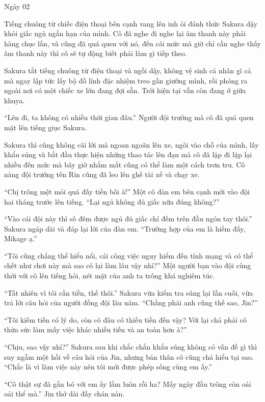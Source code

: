 {Ngày 02}
{

Tiếng chuông từ chiếc điện thoại bên cạnh vang lên inh ỏi đánh thức
Sakura dậy khỏi giấc ngủ ngắn hạn của mình. Cô đã nghe đi nghe lại âm
thanh này phải hàng chục lần, và cũng đã quá quen với nó, đến cái mức mà
giờ chỉ cần nghe thấy âm thanh này thì cô sẽ tự động biết phải làm gì
tiếp theo.

Sakura tắt tiếng chuông từ điện thoại và ngồi dậy, không vệ sinh cá nhân
gì cả mà ngay lập tức lấy bộ đồ lính đặc nhiệm treo gần giường mình, rồi
phóng ra ngoài nơi có một chiếc xe lớn đang đợi sẵn. Trời hiện tại vẫn
còn đang ở giữa khuya.

``Lên đi, ta không có nhiều thời gian đâu.'' Người đội trưởng mà cô đã
quá quen mặt lên tiếng giục Sakura.

Sakura thì cũng không cãi lời mà ngoan ngoãn lên xe, ngôi vào chỗ của
mình, lấy khẩu súng và bắt đầu thực hiện những thao tác lên đạn mà cô đã
lặp đi lặp lại nhiều đến mức mà bây giờ nhắm mắt cũng có thể làm một
cách trơn tru. Cô nàng đội trưởng tên Rin cũng đã leo lên ghế tài xế và
chạy xe.

``Chị trông mệt mỏi quá đấy tiền bối à!'' Một cô đàn em bên cạnh mới vào
đội hai tháng trước lên tiếng. ``Lại ngủ không đủ giấc nữa đúng không?''

``Vào cái đội này thì số đêm được ngủ đủ giấc chỉ đếm trên đầu ngón tay
thôi.'' Sakura ngáp dài và đáp lại lời của đàn em. ``Trường hợp của em
là hiếm đấy, Mikage ạ.''

``Tôi cũng chẳng thể hiểu nổi, cái công việc nguy hiểm đến tính mạng và
có thể chết như chơi này mà sao cô lại làm lâu vậy nhỉ?'' Một người bạn
vào đội cùng thời với cô lên tiếng hỏi, nét mặt của anh ta trông khá
nghiêm túc.

``Tất nhiên vì tôi cần tiền, thế thôi.'' Sakura vừa kiểm tra súng lại
lần cuối, vừa trả lời câu hỏi của người đồng đội lâu năm. ``Chẳng phải
anh cũng thế sao, Jin?''

``Tôi kiếm tiền có lý do, còn cô đâu có thiếu tiền đến vậy? Với lại chả
phải cô thừa sức làm mấy việc khác nhiều tiền và an toàn hơn à?''

``Chịu, sao vậy nhỉ?'' Sakura sau khi chắc chắn khẩu súng không có vấn
đề gì thì suy ngẫm một hồi về câu hỏi của Jin, nhưng bản thân cô cũng
chả hiểu tại sao. ``Chắc là vì làm việc này nên tôi mới được phép sống
cùng em ấy.''

``Cô thật sự đã gắn bó với em ấy lắm luôn rồi ha? Mấy ngày đầu trông còn
oải oải thể mà.'' Jin thở dài đầy chán nản.

}
